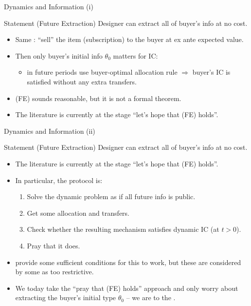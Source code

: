\documentclass[english,10pt
,aspectratio=169
]{beamer}
\begin{document}
\begin{frame}{Dynamics and Information (i)}
	\begin{block}{Statement (Future Extraction)}
		Designer can extract all of buyer's  info at no cost.
	\end{block}
	\begin{minipage}[c][0.55\textheight][s]{\textwidth}
	\begin{itemize}
		\item Same : ``sell'' the item (subscription) to the buyer at ex ante expected value.
		\item Then only buyer's \alert{initial} info $\theta_0$ matters for IC:
		\begin{itemize}
			\item in future periods use buyer-optimal allocation rule $\Rightarrow$ buyer's IC is satisfied without any extra transfers.
		\end{itemize}
		\item (FE) sounds reasonable, but it is not a formal theorem.
		\item The literature is currently at the stage ``let's hope that (FE) holds''. 
	\end{itemize}
	\end{minipage}
\end{frame}


\begin{frame}{Dynamics and Information (ii)}
	\begin{block}{Statement (Future Extraction)}
		Designer can extract all of buyer's  info at no cost.
	\end{block}
	\begin{minipage}[c][0.55\textheight][s]{\textwidth}
		\begin{itemize}
			\item The literature is currently at the stage ``let's hope that (FE) holds''. 
			\item In particular, the protocol is:
			\begin{enumerate}
				\item Solve the dynamic problem \alert{as if} all future info is \alert{public}.
				\item Get some allocation and transfers.
				\item Check whether the resulting mechanism satisfies dynamic IC (at $t>0$).
				\item Pray that it does.
			\end{enumerate}
			\item \cite*{pavan_dynamic_2014} provide some sufficient conditions for this to work, but these are considered by some as too restrictive.
			\item We today take the ``pray that (FE) holds'' approach and only worry about extracting the buyer's initial type $\theta_0$ -- we are  to the .
		\end{itemize}
	\end{minipage}
\end{frame}
\end{document}
